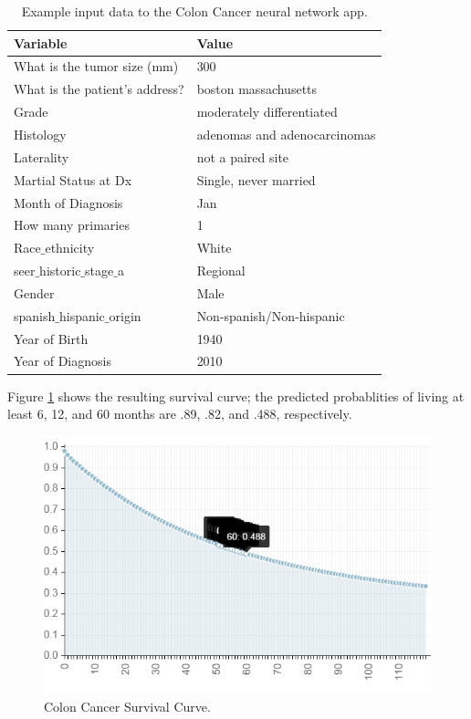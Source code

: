 \documentclass{article}
\begin{document}
\begin{table}
\begin{center}
\begin{tabular}{| l | l|}
  \hline
  Variable  & Value \\ \hline
  What is the tumor size (mm) & 300 \\  \hline
  What is the patient's address? & boston massachusetts \\ \hline
  Grade & moderately differentiated \\  \hline
  Histology & adenomas and adenocarcinomas \\ \hline
  Laterality & not a paired site \\  \hline
 Martial Status at Dx & Single, never married \\  \hline
 Month of Diagnosis & Jan \\  \hline
 How many primaries & 1 \\  \hline
  Race$\_$ethnicity & White \\  \hline
  seer$\_$historic$\_$stage$\_$a  & Regional \\ \hline
  Gender & Male \\  \hline
  spanish$\_$hispanic$\_$origin & Non-spanish/Non-hispanic \\ \hline
 Year of Birth & 1940 \\  \hline
  Year of Diagnosis & 2010 \\
\hline
\end{tabular}
\caption{Example input data to the Colon Cancer neural network app.}
\label{tab:boston1940}
\end{center}
\end{table}


Figure \ref{fig:boston1940} shows the resulting survival curve; the predicted probablities of living 
at least 6, 12, and 60 months are .89, .82, and .488, respectively.

\begin{figure}[!ht]
 \caption{Colon Cancer Survival Curve.}
  \label{fig:boston1940}
  \centering
    \includegraphics[scale=.5]{boston1940}
\end{figure}
\end{document}
